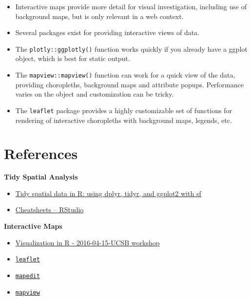 \documentclass[]{book}
\providecommand{\tightlist}{%
  \setlength{\itemsep}{0pt}\setlength{\parskip}{0pt}}
\theoremstyle{definition}
\theoremstyle{definition}
\theoremstyle{definition}
\theoremstyle{remark}
\begin{document}
\begin{itemize}
\tightlist
\item
  Interactive maps provide more detail for visual investigation,
  including use of background maps, but is only relevant in a web
  context.
\item
  Several packages exist for providing interactive views of data.
\item
  The \texttt{plotly::ggplotly()} function works quickly if you already
  have a ggplot object, which is best for static output.
\item
  The \texttt{mapview::mapview()} function can work for a quick view of
  the data, providing choropleths, background maps and attribute popups.
  Performance varies on the object and customization can be tricky.
\item
  The \texttt{leaflet} package provides a highly customizable set of
  functions for rendering of interactive choropleths with background
  maps, legends, etc.
\end{itemize}

\chapter*{References}\label{references}

\textbf{Tidy Spatial Analysis}

\begin{itemize}
\tightlist
\item
  \href{http://strimas.com/r/tidy-sf/}{Tidy spatial data in R: using
  dplyr, tidyr, and ggplot2 with sf}
\item
  \href{https://www.rstudio.com/resources/cheatsheets/}{Cheatsheets --
  RStudio}
\end{itemize}

\textbf{Interactive Maps}

\begin{itemize}
\tightlist
\item
  \href{http://remi-daigle.github.io/2016-04-15-UCSB/viz/}{Visualization
  in R - 2016-04-15-UCSB workshop}
\item
  \href{http://rstudio.github.io/leaflet/}{\texttt{leaflet}}
\item
  \href{http://r-spatial.org/r/2017/01/30/mapedit_intro.html}{\texttt{mapedit}}
\item
  \href{https://r-spatial.github.io/mapview/}{\texttt{mapview}}
\end{itemize}
\end{document}
